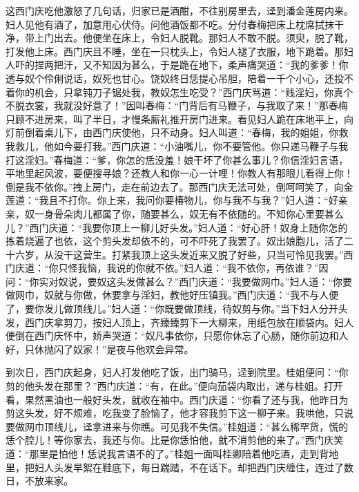 这西门庆吃他激怒了几句话，归家已是酒酣，不往别房里去，迳到潘金莲房内来。妇人见他有酒了，加意用心伏侍。问他酒饭都不吃。分付春梅把床上枕席拭抹干净，带上门出去。他便坐在床上，令妇人脱靴。那妇人不敢不脱。须臾，脱了靴，打发他上床。西门庆且不睡，坐在一只枕头上，令妇人褪了衣服，地下跪着。那妇人吓的捏两把汗，又不知因为甚么，于是跪在地下，柔声痛哭道：“我的爹爹！你透与奴个伶俐说话，奴死也甘心。饶奴终日恁提心吊胆，陪着一千个小心，还投不着你的机会，只拿钝刀子锯处我，教奴怎生吃受？”西门庆骂道：“贱淫妇，你真个不脱衣裳，我就没好意了！”因叫春梅：“门背后有马鞭子，与我取了来！”那春梅只顾不进房来，叫了半日，才慢条厮礼推开房门进来。看见妇人跪在床地平上，向灯前倒着桌儿下，由西门庆使他，只不动身。妇人叫道：“春梅，我的姐姐，你救我救儿，他如今要打我。”西门庆道：“小油嘴儿，你不要管他。你只递马鞭子与我打这淫妇。”春梅道：“爹，你怎的恁没羞！娘干坏了你甚么事儿？你信淫妇言语，平地里起风波，要便搜寻娘？还教人和你一心一计哩！你教人有那眼儿看得上你！倒是我不依你。”拽上房门，走在前边去了。那西门庆无法可处，倒呵呵笑了，向金莲道：“我且不打你。你上来，我问你要椿物儿，你与我不与我？”妇人道：“好亲亲，奴一身骨朵肉儿都属了你，随要甚么，奴无有不依随的。不知你心里要甚么儿？”西门庆道：“我要你顶上一柳儿好头发。”妇人道：“好心肝！奴身上随你怎的拣着烧遍了也依，这个剪头发却依不的，可不吓死了我罢了。奴出娘胞儿，活了二十六岁，从没干这营生。打紧我顶上这头发近来又脱了好些，只当可怜见我罢。”西门庆道：“你只怪我恼，我说的你就不依。”妇人道：“我不依你，再依谁？”因问：“你实对奴说，要奴这头发做甚么？”西门庆道：“我要做网巾。”妇人道：“你要做网巾，奴就与你做，休要拿与淫妇，教他好压镇我。”西门庆道：“我不与人便了，要你发儿做顶线儿。”妇人道：“你既要做顶线，待奴剪与你。”当下妇人分开头发，西门庆拿剪刀，按妇人顶上，齐臻臻剪下一大柳来，用纸包放在顺袋内。妇人便倒在西门庆怀中，娇声哭道：“奴凡事依你，只愿你休忘了心肠，随你前边和人好，只休抛闪了奴家！”是夜与他欢会异常。

到次日，西门庆起身，妇人打发他吃了饭，出门骑马，迳到院里。桂姐便问：“你剪的他头发在那里？”西门庆道：“有，在此。”便向茄袋内取出，递与桂姐。打开看，果然黑油也一般好头发，就收在袖中。西门庆道：“你看了还与我，他昨日为剪这头发，好不烦难，吃我变了脸恼了，他才容我剪下这一柳子来。我哄他，只说要做网巾顶线儿，迳拿进来与你瞧。可见我不失信。”桂姐道：“甚么稀罕货，慌的恁个腔儿！等你家去，我还与你。比是你恁怕他，就不消剪他的来了。”西门庆笑道：“那里是怕他！恁说我言语不的了。”桂姐一面叫桂卿陪着他吃酒，走到背地里，把妇人头发早絮在鞋底下，每日踹踏，不在话下。却把西门庆缠住，连过了数日，不放来家。

